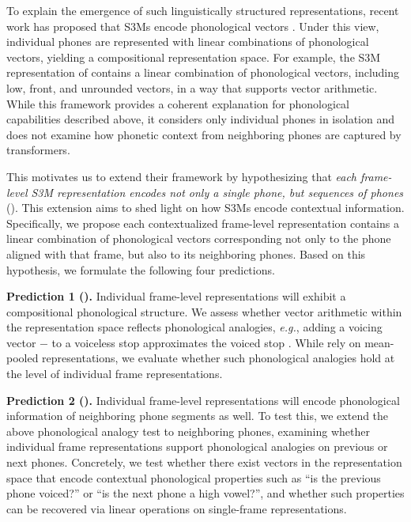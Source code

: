 \documentclass[cameraready]{Interspeech}
\begin{document}
To explain the emergence of such linguistically structured representations, recent work has proposed that S3Ms encode phonological vectors \cite{choi2026self}.
Under this view, individual phones are represented with linear combinations of phonological vectors, yielding a compositional representation space.
For example, the S3M representation of \textipa{[\ae]} contains a linear combination of phonological vectors, including low, front, and unrounded vectors, in a way that supports vector arithmetic.
While this framework provides a coherent explanation for phonological capabilities described above, it considers only individual phones in isolation and does not examine how phonetic context from neighboring phones are captured by transformers.


This motivates us to extend their framework by hypothesizing that \textit{each frame-level S3M representation encodes not only a single phone, but sequences of phones} ().
This extension aims to shed light on how S3Ms encode contextual information.
Specifically, we propose each contextualized frame-level representation contains a linear combination of phonological vectors corresponding not only to the phone aligned with that frame, but also to its neighboring phones.
Based on this hypothesis, we formulate the following four predictions.


\textbf{Prediction 1 ().}
Individual frame-level representations will exhibit a compositional phonological structure.
We assess whether vector arithmetic within the representation space reflects phonological analogies, \textit{e.g.}, adding a voicing vector \textipa{[d]} $-$ \textipa{[t]} to a voiceless stop \textipa{[p]} approximates the voiced stop \textipa{[b]}.
While \cite{choi2026self} rely on mean-pooled representations, we evaluate whether such phonological analogies hold at the level of individual frame representations.


\textbf{Prediction 2 ().}
Individual frame-level representations will encode phonological information of neighboring phone segments as well.
To test this, we extend the above phonological analogy test to neighboring phones, examining whether individual frame representations support phonological analogies on previous or next phones.
Concretely, we test whether there exist vectors in the representation space that encode contextual phonological properties such as ``is the previous phone voiced?'' or ``is the next phone a high vowel?'', and whether such properties can be recovered via linear operations on single-frame representations.
\end{document}
